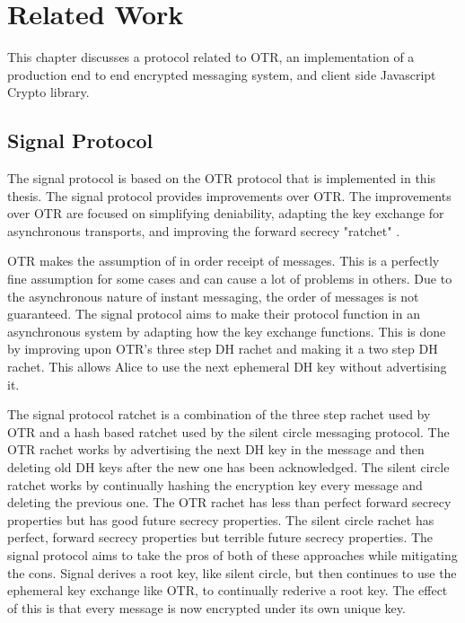 \chapter{Related Work}


This chapter discusses a protocol related to OTR, an implementation of a production end to end encrypted messaging system, and client side Javascript Crypto library.


\section{Signal Protocol} 


The signal protocol is based on the OTR protocol that is implemented in this thesis. The signal protocol provides improvements over OTR. The improvements over OTR are focused on simplifying deniability, adapting the key exchange for asynchronous transports, and improving the forward secrecy "ratchet" \cite{whisper-overview}.


OTR makes the assumption of in order receipt of messages. This is a perfectly fine assumption for some cases and can cause a lot of problems in others. Due to the asynchronous nature of instant messaging, the order of messages is not guaranteed. The signal protocol aims to make their protocol function in an asynchronous system by adapting how the key exchange functions. This is done by improving upon OTR’s three step DH rachet and making it a two step DH rachet. This allows Alice to use the next ephemeral DH key without advertising it.


The signal protocol ratchet is a combination of the three step rachet used by OTR and a hash based ratchet used by the silent circle messaging protocol. The OTR rachet works by advertising the next DH key in the message and then deleting old DH keys after the new one has been acknowledged. The silent circle ratchet works by continually hashing the encryption key every message and deleting the previous one. The OTR rachet has less than perfect forward secrecy properties but has good future secrecy properties. The silent circle rachet has perfect, forward secrecy properties but terrible future secrecy properties. The signal protocol aims to take the pros of both of these approaches while mitigating the cons. Signal derives a root key, like silent circle, but then continues to use the ephemeral key exchange like OTR, to continually rederive a root key. The effect of this is that every message is now encrypted under its own unique key.
 
